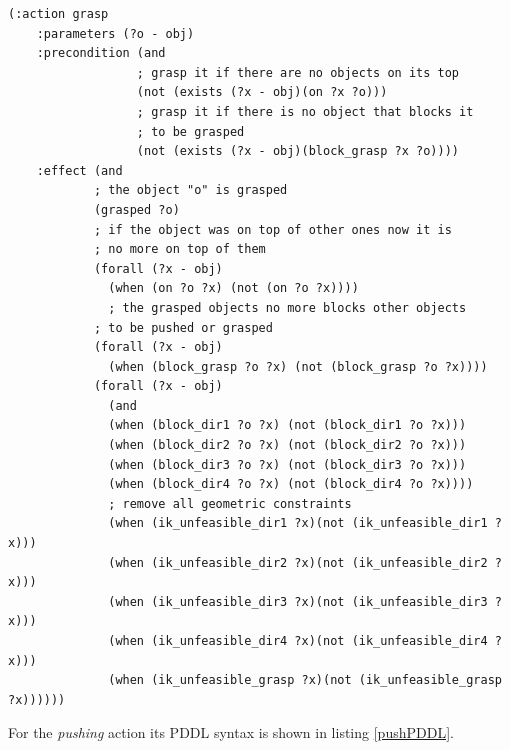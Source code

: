 \lstset{language=pddl}
\begin{lstlisting}[caption={PDDL syntax of the grasping action},label=graspPDDL]
(:action grasp
    :parameters (?o - obj)
    :precondition (and
                  ; grasp it if there are no objects on its top
                  (not (exists (?x - obj)(on ?x ?o)))
                  ; grasp it if there is no object that blocks it
                  ; to be grasped
                  (not (exists (?x - obj)(block_grasp ?x ?o))))
    :effect (and
            ; the object "o" is grasped
            (grasped ?o)
            ; if the object was on top of other ones now it is
            ; no more on top of them
            (forall (?x - obj)
              (when (on ?o ?x) (not (on ?o ?x))))
              ; the grasped objects no more blocks other objects 
            ; to be pushed or grasped
            (forall (?x - obj)
              (when (block_grasp ?o ?x) (not (block_grasp ?o ?x))))
            (forall (?x - obj)
              (and
              (when (block_dir1 ?o ?x) (not (block_dir1 ?o ?x)))
              (when (block_dir2 ?o ?x) (not (block_dir2 ?o ?x)))
              (when (block_dir3 ?o ?x) (not (block_dir3 ?o ?x)))
              (when (block_dir4 ?o ?x) (not (block_dir4 ?o ?x))))
              ; remove all geometric constraints 
              (when (ik_unfeasible_dir1 ?x)(not (ik_unfeasible_dir1 ?x)))
              (when (ik_unfeasible_dir2 ?x)(not (ik_unfeasible_dir2 ?x)))
              (when (ik_unfeasible_dir3 ?x)(not (ik_unfeasible_dir3 ?x)))
              (when (ik_unfeasible_dir4 ?x)(not (ik_unfeasible_dir4 ?x)))
              (when (ik_unfeasible_grasp ?x)(not (ik_unfeasible_grasp ?x))))))
\end{lstlisting}

For the \textit{pushing} action its PDDL syntax is shown in listing \ref{pushPDDL}.

